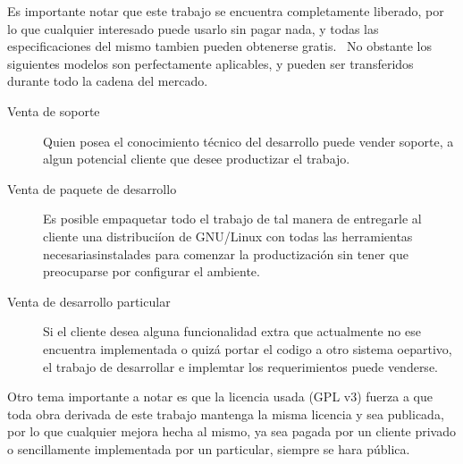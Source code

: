 Es importante notar que este trabajo se encuentra completamente liberado, por
lo que cualquier interesado puede usarlo sin pagar nada, y todas las
especificaciones del mismo tambien pueden obtenerse gratis. \
No obstante los siguientes modelos son perfectamente aplicables, y pueden ser
transferidos durante todo la cadena del mercado.\\


\begin{description}
 \item[Venta de soporte] Quien posea el conocimiento t\'ecnico del desarrollo
puede vender soporte, a algun potencial cliente que desee productizar el
trabajo. 

 \item[Venta de paquete de desarrollo] Es posible empaquetar todo el trabajo de
tal manera de entregarle al cliente una distribuci\'ion de GNU/Linux con todas
las herramientas necesariasinstalades para comenzar la productizaci\'on sin
tener que preocuparse por configurar el ambiente. 

 \item[Venta de desarrollo particular] Si el cliente desea alguna
funcionalidad extra que actualmente no ese encuentra implementada o quiz\'a
portar el codigo a otro sistema oepartivo, el trabajo de desarrollar e
implemtar los requerimientos puede venderse.
\end{description}

Otro tema importante a notar es que la licencia usada (GPL v3) fuerza a que
toda obra derivada de este trabajo mantenga la misma licencia y sea publicada,
por lo que cualquier mejora hecha al mismo, ya sea pagada por un cliente
privado o sencillamente implementada por un particular, siempre se hara
p\'ublica.




